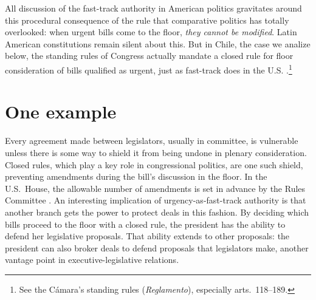 \documentclass[letter,12pt]{article}
\begin{document}

All discussion of the fast-track authority in American politics gravitates around this procedural consequence of the rule that comparative politics has totally overlooked: when urgent bills come to the floor, \emph{they cannot be modified}. Latin American constitutions remain silent about this. But in Chile, the case we analize below, the standing rules of Congress actually mandate a closed rule for floor consideration of bills qualified as urgent, just as fast-track does in the U.S. \citep{sotoCongChile2015}.\footnote{See the Cámara's standing rules (\emph{Reglamento}), especially arts.\ 118--189.} 

\section{One example}

Every agreement made between legislators, usually in committee, is vulnerable unless there is some way to shield it from being undone in plenary consideration. Closed rules, which play a key role in congressional politics, are one such shield, preventing amendments during the bill's discussion in the floor. In the U.S.\ House, the allowable number of amendments is set in advance by the Rules Committee \citep{dion.huber.1996,krehbielRestrictiveRules1997,cox.mccubbins.1997}. An interesting implication of urgency-as-fast-track authority is that another branch gets the power to protect deals in this fashion. By deciding which bills proceed to the floor with a closed rule, the president has the ability to defend her legislative proposals. That ability extends to other proposals: the president can also broker deals to defend proposals that legislators make, another vantage point in executive-legislative relations.
\end{document}
